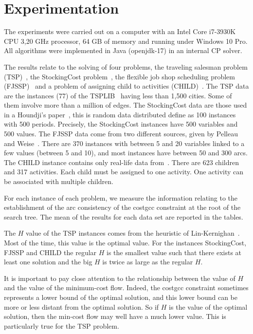 \section{Experimentation} 
\label{sec:Experimentation}


The experiments were carried out on a computer with an Intel Core i7-3930K CPU 3,20 GHz processor, 64 GB of memory and running under Windows 10 Pro.
All algorithms were implemented in Java (openjdk-17) in an internal CP solver.

The results relate to the solving of four problems, 
the traveling salesman problem (TSP)~\cite{Isoart:Thetravelingsalesmanprobleminconstraintprogramming}, the StockingCost problem~\cite{Houndji:dataset_item}, the flexible job shop scheduling problem (FJSSP)~\cite{Pelleau:dataFJSSP,Weise:jsspInstancesAndResults} and a problem of assigning child to activities (CHILD)~\cite{Varone:dataCHILD}. The TSP data are the instances (77) of the TSPLIB~\cite{Reinelt:TSPLIB} having less than 1,500 cities. Some of them involve more than a million of edges. 
The StockingCost data are those used in a Houndji's paper~\cite{Houndji:dataset_item}, this is random data distributed define as 
100 instances with 500 periods. Precisely, 
the StockingCost instances have 500 variables and 500 values. 
The FJSSP data come from two different sources, given 
by Pelleau~\cite{Pelleau:dataFJSSP} and Weise~\cite{Weise:jsspInstancesAndResults}. There are 370 instances with between 5 and 20 variables linked to a few values (between 5 and 10), and most instances have between 50 and 300 arcs. 
The CHILD instance contains only real-life data from~\cite{Varone:dataCHILD}. There are 623 children and 317 activities. Each child must be assigned to one activity. One activity can be associated with multiple children.

For each instance of each problem, we measure the information relating to the establishment of the arc consistency of the costgcc constraint at the root of the search tree. The mean of the results for each data set are reported in the tables.

The $H$ value of the TSP instances comes from the heuristic of Lin-Kernighan~\cite{Lin:HeuristicTSP}. Most of the time, this value is the optimal value. For the instances 
StockingCost, FJSSP and CHILD the regular $H$ is the smallest value such that there exists at least one solution and the big $H$ is twice as large as the regular $H$.

It is important to pay close attention to the relationship between the value of $H$ and the value of the minimum-cost flow. Indeed, the costgcc constraint sometimes represents a lower bound of the optimal solution, and this lower bound can be more or less distant from the optimal solution. 
So if $H$ is the value of the optimal solution, then the min-cost flow may well have a much lower value.  This is particularly true for the TSP problem.

